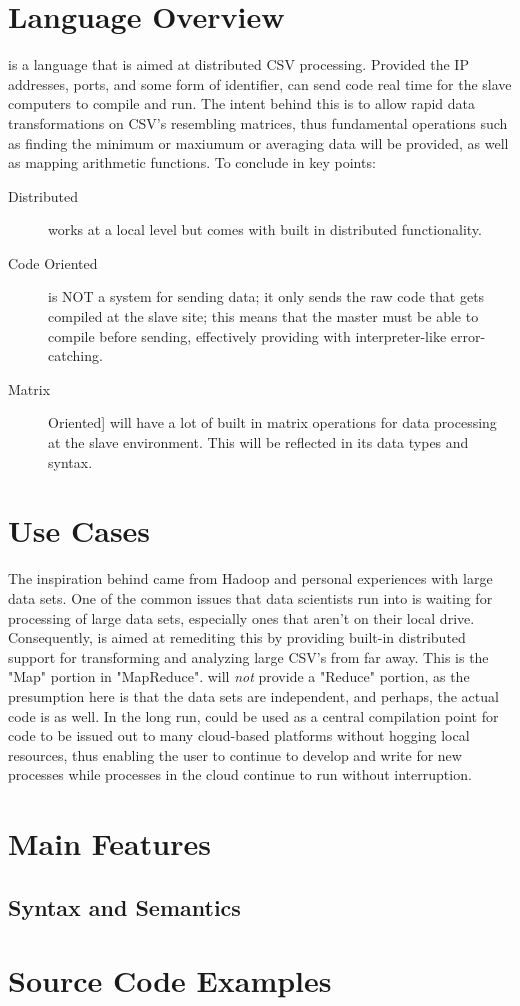 \documentclass[10pt]{article}
\title{\name}
\author{PLT Group}
\begin{document}
\maketitle

\section{Language Overview}
    \name is a language that is aimed at distributed CSV processing. Provided the IP addresses, ports, and some form of identifier, \name can send code real time for the slave computers to compile and run. The intent behind this is to allow rapid data transformations on CSV's resembling matrices, thus fundamental operations such as finding the minimum or maxiumum or averaging data will be provided, as well as mapping arithmetic functions. To conclude in key points:
    \begin{description}
    \item[Distributed] \name works at a local level but comes with built in distributed functionality.
    \item[Code Oriented] \name is NOT a system for sending data; it only sends the raw code that gets compiled at the slave site; this means that the master must be able to compile before sending, effectively providing \name with interpreter-like error-catching.
    \item[Matrix] Oriented] \name will have a lot of built in matrix operations for data processing at the slave environment. This will be reflected in its data types and syntax.
    \end{description}
    
\section{Use Cases}
	The inspiration behind \name came from Hadoop and personal experiences with large data sets. One of the common issues that data scientists run into is waiting for processing of large data sets, especially ones that aren't on their local drive. Consequently, \name is aimed at remediting this by providing built-in distributed support for transforming and analyzing large CSV's from far away. This is the "Map" portion in "MapReduce". \name will \emph{not} provide a "Reduce" portion, as the presumption here is that the data sets are independent, and perhaps, the actual code is as well.
    In the long run, \name could be used as a central compilation point for code to be issued out to many cloud-based platforms without hogging local resources, thus enabling the user to continue to develop and write for new processes while processes in the cloud continue to run without interruption.
    
\section{Main Features}
	\subsection{Syntax and Semantics}
    
\section{Source Code Examples}
\end{document}
